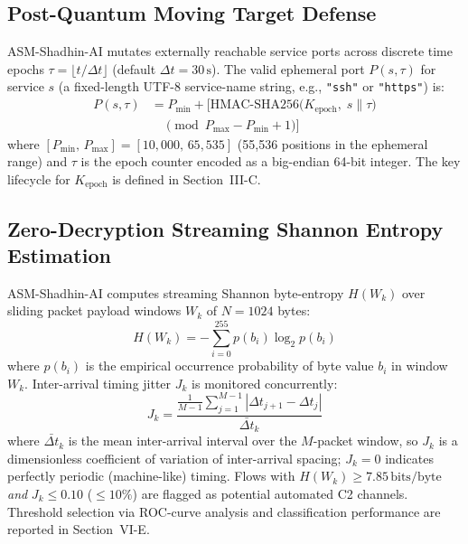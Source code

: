 \documentclass[journal]{IEEEtran}
\renewcommand{\_}{\textunderscore\allowbreak}
\begin{document}
\subsection{Post-Quantum Moving Target Defense}
ASM-Shadhin-AI mutates externally reachable service ports across discrete time
epochs $\tau = \lfloor t / \Delta t \rfloor$ (default $\Delta t = 30\,\text{s}$).
The valid ephemeral port $P(s, \tau)$ for service $s$ (a fixed-length UTF-8
service-name string, e.g., \texttt{"ssh"} or \texttt{"https"}) is:
\begin{align}
  P(s, \tau) &= P_{\min} + \Big[\text{HMAC-SHA256}\big(K_{\text{epoch}},\; s \| \tau\big)
               \nonumber \\
              &\quad \pmod{P_{\max} - P_{\min} + 1}\Big]
  \label{eq:mtd}
\end{align}
where $[P_{\min},\, P_{\max}] = [10{,}000,\, 65{,}535]$ (55{,}536 positions in the
ephemeral range) and $\tau$ is the epoch counter encoded as a big-endian
64-bit integer. The key lifecycle for $K_{\text{epoch}}$ is defined in
Section~III-C.

\subsection{Zero-Decryption Streaming Shannon Entropy Estimation}
ASM-Shadhin-AI computes streaming Shannon byte-entropy $H(W_k)$ over sliding
packet payload windows $W_k$ of $N = 1024$ bytes:
\begin{equation}
  H(W_k) = -\sum_{i=0}^{255} p(b_i) \log_2 p(b_i)
  \label{eq:entropy}
\end{equation}
where $p(b_i)$ is the empirical occurrence probability of byte value $b_i$
in window $W_k$. Inter-arrival timing jitter $J_k$ is monitored concurrently:
\begin{equation}
  J_k = \frac{\frac{1}{M-1}\sum_{j=1}^{M-1} \left|\Delta t_{j+1} - \Delta t_j\right|}{\bar{\Delta t}_k}
  \label{eq:jitter}
\end{equation}
where $\bar{\Delta t}_k$ is the mean inter-arrival interval over the $M$-packet
window, so $J_k$ is a dimensionless coefficient of variation of inter-arrival
spacing; $J_k = 0$ indicates perfectly periodic (machine-like) timing. Flows
with $H(W_k) \ge 7.85\,\text{bits/byte}$ \emph{and} $J_k \le 0.10$ ($\le 10\%$)
are flagged as potential automated C2 channels. Threshold selection via
ROC-curve analysis and classification performance are reported in
Section~VI-E.
\end{document}
